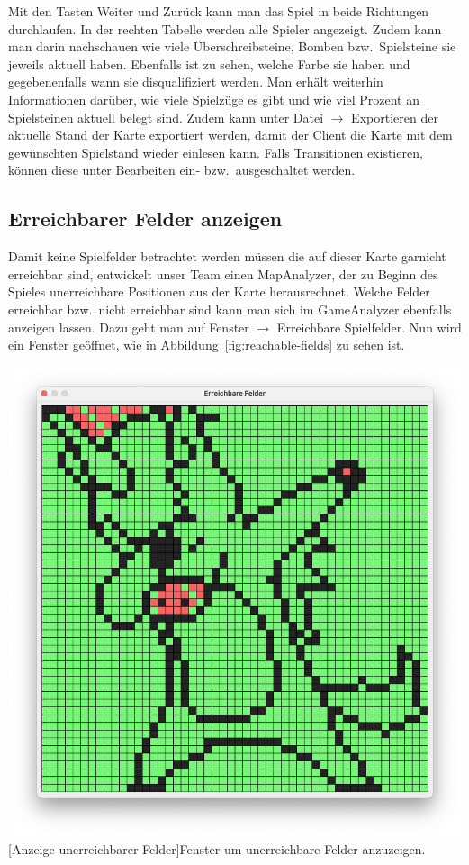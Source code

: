 Mit den Tasten Weiter und Zur\"uck kann man das Spiel in beide Richtungen durchlaufen.
In der rechten Tabelle werden alle Spieler angezeigt.
Zudem kann man darin nachschauen wie viele \"Uberschreibsteine, Bomben bzw.\ Spielsteine sie jeweils aktuell haben.
Ebenfalls ist zu sehen, welche Farbe sie haben und gegebenenfalls wann sie disqualifiziert werden.
Man erh\"alt weiterhin Informationen dar\"uber, wie viele Spielz\"uge es gibt und wie viel Prozent an Spielsteinen aktuell belegt sind.
Zudem kann unter Datei $\rightarrow$ Exportieren der aktuelle Stand der Karte exportiert werden, damit der Client die Karte mit dem gew\"unschten Spielstand wieder einlesen kann.
Falls Transitionen existieren, k\"onnen diese unter Bearbeiten ein- bzw.\ ausgeschaltet werden.

\subsection{Erreichbarer Felder anzeigen}\label{subsec:erreichbarer-felder-anzeigen}
Damit keine Spielfelder betrachtet werden m\"ussen die auf dieser Karte garnicht erreichbar sind, entwickelt unser Team einen MapAnalyzer, der zu Beginn des Spieles unerreichbare Positionen aus der Karte herausrechnet.
Welche Felder erreichbar bzw.\ nicht erreichbar sind kann man sich im GameAnalyzer ebenfalls anzeigen lassen.
Dazu geht man auf Fenster $\rightarrow$ Erreichbare Spielfelder.
Nun wird ein Fenster ge\"offnet, wie in Abbildung~\ref{fig:reachable-fields} zu sehen ist.

\vspace{1em}
\begin{minipage}{\linewidth}
    \centering
    \includegraphics[width=0.6\linewidth]{pics/reachable-fields}
    [Anzeige unerreichbarer Felder]{Fenster um unerreichbare Felder anzuzeigen.}
    \label{fig:reachable-fields}
\end{minipage}

